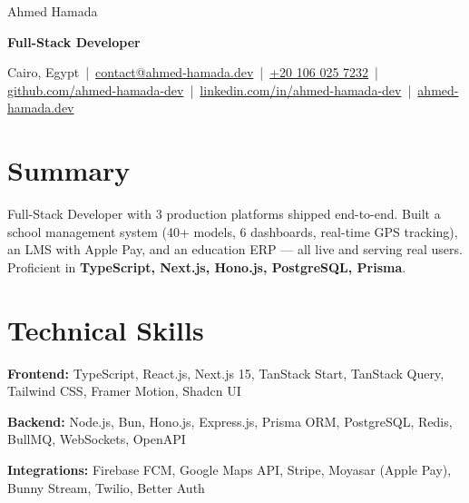 \documentclass[10pt, letterpaper]{article}
\begin{document}
\renewcommand{\baselinestretch}{0.95}\selectfont

\begin{center}
    {\fontsize{25pt}{15pt}\selectfont Ahmed Hamada}

    {\large \textbf{Full-Stack Developer}}

    \vspace{5pt}

    Cairo, Egypt \,|\,
    \href{mailto:contact@ahmed-hamada.dev}{contact@ahmed-hamada.dev} \,|\,
    \href{tel:+201060257232}{+20 106 025 7232} \,|\,
    \href{https://github.com/ahmed-hamada-dev}{github.com/ahmed-hamada-dev} \,|\,
    \href{https://linkedin.com/in/ahmed-hamada-dev}{linkedin.com/in/ahmed-hamada-dev} \,|\,
    \href{https://ahmed-hamada.dev}{ahmed-hamada.dev}
\end{center}

\vspace{0.15cm}

\section{Summary}

Full-Stack Developer with 3 production platforms shipped end-to-end. Built a school management system (40+ models, 6 dashboards, real-time GPS tracking), an LMS with Apple Pay, and an education ERP — all live and serving real users. Proficient in \textbf{TypeScript, Next.js, Hono.js, PostgreSQL, Prisma}.

\section{Technical Skills}

\textbf{Frontend:} TypeScript, React.js, Next.js 15, TanStack Start, TanStack Query, Tailwind CSS, Framer Motion, Shadcn UI

\vspace{0.08cm}

\textbf{Backend:} Node.js, Bun, Hono.js, Express.js, Prisma ORM, PostgreSQL, Redis, BullMQ, WebSockets, OpenAPI

\vspace{0.08cm}

\textbf{Integrations:} Firebase FCM, Google Maps API, Stripe, Moyasar (Apple Pay), Bunny Stream, Twilio, Better Auth

\vspace{0.08cm}
\end{document}

